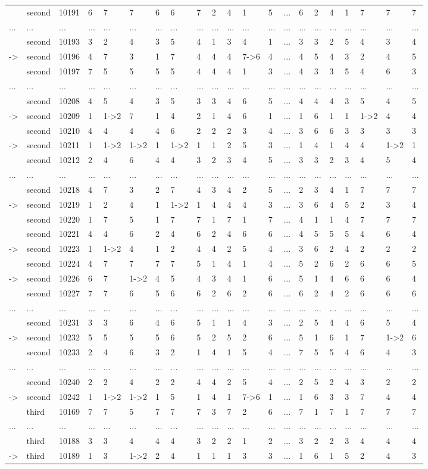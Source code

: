 \begin{landscape}
{\begin{longtable}{lllllllllllllllllllll}
&second&10191&6&7&7&6&6&7&2&4&1&5&...&6&2&4&1&7&7&7\tabularnewline
...&...&...&...&...&...&...&...&...&...&...&...&...&...&...&...&...&...&...&...&...\tabularnewline
&second&10193&3&2&4&3&5&4&1&3&4&1&...&3&3&2&5&4&3&4\tabularnewline
-\textgreater &second&10196&4&7&3&1&7&4&4&4&7-\textgreater 6&4&...&4&5&4&3&2&4&5\tabularnewline
&second&10197&7&5&5&5&5&4&4&4&1&3&...&4&3&3&5&4&6&3\tabularnewline
...&...&...&...&...&...&...&...&...&...&...&...&...&...&...&...&...&...&...&...&...\tabularnewline
&second&10208&4&5&4&3&5&3&3&4&6&5&...&4&4&4&3&5&4&5\tabularnewline
-\textgreater &second&10209&1&1-\textgreater 2&7&1&4&2&1&4&6&1&...&1&6&1&1&1-\textgreater 2&4&4\tabularnewline
&second&10210&4&4&4&4&6&2&2&2&3&4&...&3&6&6&3&3&3&3\tabularnewline
-\textgreater &second&10211&1&1-\textgreater 2&1-\textgreater 2&1&1-\textgreater 2&1&1&2&5&3&...&1&4&1&4&4&1-\textgreater 2&1\tabularnewline
&second&10212&2&4&6&4&4&3&2&3&4&5&...&3&3&2&3&4&5&4\tabularnewline
...&...&...&...&...&...&...&...&...&...&...&...&...&...&...&...&...&...&...&...&...\tabularnewline
&second&10218&4&7&3&2&7&4&3&4&2&5&...&2&3&4&1&7&7&7\tabularnewline
-\textgreater &second&10219&1&2&4&1&1-\textgreater 2&1&4&4&4&3&...&3&6&4&5&2&3&4\tabularnewline
&second&10220&1&7&5&1&7&7&1&7&1&7&...&4&1&1&4&7&7&7\tabularnewline
&second&10221&4&4&6&2&4&6&2&4&6&6&...&4&5&5&5&4&6&4\tabularnewline
-\textgreater &second&10223&1&1-\textgreater 2&4&1&2&4&4&2&5&4&...&3&6&2&4&2&2&2\tabularnewline
&second&10224&4&7&7&7&7&5&1&4&1&4&...&5&2&6&2&6&6&5\tabularnewline
-\textgreater &second&10226&6&7&1-\textgreater 2&4&5&4&3&4&1&6&...&5&1&4&6&6&6&4\tabularnewline
&second&10227&7&7&6&5&6&6&2&6&2&6&...&6&2&4&2&6&6&6\tabularnewline
...&...&...&...&...&...&...&...&...&...&...&...&...&...&...&...&...&...&...&...&...\tabularnewline
&second&10231&3&3&6&4&6&5&1&1&4&3&...&2&5&4&4&6&5&4\tabularnewline
-\textgreater &second&10232&5&5&5&5&6&5&2&5&2&6&...&5&1&6&1&7&1-\textgreater 2&6\tabularnewline
&second&10233&2&4&6&3&2&1&4&1&5&4&...&7&5&5&4&6&4&3\tabularnewline
...&...&...&...&...&...&...&...&...&...&...&...&...&...&...&...&...&...&...&...&...\tabularnewline
&second&10240&2&2&4&2&2&4&4&2&5&4&...&2&5&2&4&3&2&2\tabularnewline
-\textgreater &second&10242&1&1-\textgreater 2&1-\textgreater 2&1&5&1&4&1&7-\textgreater 6&1&...&1&6&3&3&7&4&4\tabularnewline
&third&10169&7&7&5&7&7&7&3&7&2&6&...&7&1&7&1&7&7&7\tabularnewline
...&...&...&...&...&...&...&...&...&...&...&...&...&...&...&...&...&...&...&...&...\tabularnewline
&third&10188&3&3&4&4&4&3&2&2&1&2&...&3&2&2&3&4&4&4\tabularnewline
-\textgreater &third&10189&1&3&1-\textgreater 2&2&4&1&1&1&3&3&...&1&6&1&5&2&4&3\tabularnewline

\end{longtable}}
\end{landscape}
